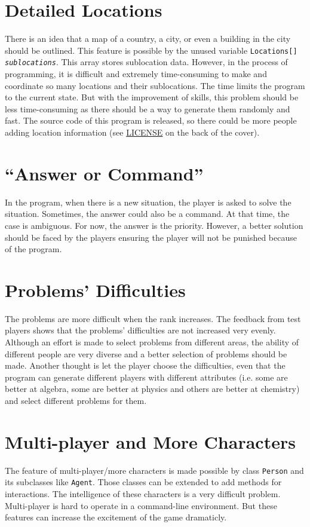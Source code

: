 \documentclass[letterpaper, 12pt]{report}
\begin{document}
\section{Detailed Locations}
There is an idea that a map of a country, a city, or even a building in the city should be outlined. This feature is possible by the unused variable \texttt{Locations[] \textit{sublocations}}. This array stores sublocation data. However, in the process of programming, it is difficult and extremely time-consuming to make and coordinate so many locations and their sublocations. The time limits the program to the current state. But with the improvement of skills, this problem should be less time-consuming as there should be a way to generate them randomly and fast. The source code of this program is released, so there could be more people adding location information (see \hyperref[chap:LICENSE]{LICENSE} on the back of the cover).

\section{``Answer or Command'' }
In the program, when there is a new situation, the player is asked to solve the situation. Sometimes, the answer could also be a command. At that time, the case is ambiguous. For now, the answer is the priority. However, a better solution should be faced by the players ensuring the player will not be punished because of the program.

\section{Problems' Difficulties}
The problems are more difficult when the rank increases. The feedback from test players shows that the problems' difficulties are not increased very evenly. Although an effort is made to select problems from different areas, the ability of different people are very diverse and a better selection of problems should be made. Another thought is let the player choose the difficulties, even that the program can generate different players with different attributes (i.e. some are better at algebra, some are better at physics and others are better at chemistry) and select different problems for them.

\section{Multi-player and More Characters}
The feature of multi-player/more characters is made possible by class \texttt{Person} and its subclasses like \texttt{Agent}. Those classes can be extended to add methods for interactions. The intelligence of these characters is a very difficult problem. Multi-player is hard to operate in a command-line environment. But these features can increase the excitement of the game dramaticly.
\end{document}
